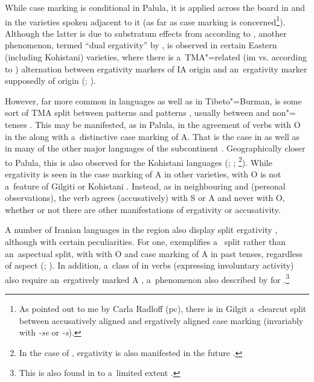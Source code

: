 While   case marking is conditional in Palula, it is applied across the board in \iliBurushaski and in the \iliShina varieties spoken adjacent to it (as far as case marking is concerned\footnote{As pointed out to me by Carla Radloff (pc), there is in Gilgit \iliShina a~clearcut split between accusatively aligned  and ergatively aligned case marking (invariably with \textit{-se} or \textit{-s}).}). Although the latter is due to substratum effects from \iliBurushaski according to \citet[248]{masica2001}, another phenomenon, termed ``dual ergativity'' by \citet[213]{hookkoul2004}, is observed in certain Eastern (including Kohistani) \iliShina varieties, where there is a~TMA"=related (im vs.  according to \citealt[51--53]{schmidtkohistani2008}) alternation between ergativity markers of IA origin and an~ergativity marker supposedly of \iliTibetan origin (\citealt[214]{hookkoul2004}; \citealt[211]{bailey1924}). 


\largerpage
However, far more common in \iliNIA languages as well as in Tibeto"=Burman, is some sort of TMA split between  patterns and  patterns \citep[248]{masica2001}, usually between  and non"= tenses \citep[342--343]{masica1991}. This may be manifested, as in Palula, in the agreement of  verbs with O in the  along with a~distinctive case marking of A. That is the case in \iliUrduHindi \citep[124]{schmidt1999} as well as in many of the other major \iliNIA languages of the subcontinent \citep[248]{masica2001}. Geographically closer to Palula, this is also observed for the Kohistani languages (\citealt[136]{baart1999a}; \citealt[34]{hallberghallberg1999}; \citealt[93--95]{lunsford2001}\footnote{In the case of \iliTorwali, ergativity is also manifested in the future .}). While ergativity is seen in the case marking of A in other \iliShina varieties,  with O is not a~feature of Gilgiti or Kohistani \iliShina. Instead, as in neighbouring \iliDameli and \iliGawarbati (personal observations), the verb agrees (accusatively) with S or A and never with O, whether or not there are other manifestations of ergativity or accusativity.



A number of Iranian languages in the region also display split ergativity \citep{payne1980}, although with certain peculiarities. For one, \iliPashto exemplifies a~ split rather than an~aspectual split, with  with O and  case marking of A in past tenses, regardless of aspect (\citealt[4--5]{tegey1977}; \citealt[71--72]{lorenz1979}). In addition, a~class of in verbs (expressing involuntary activity) also require an~ergatively marked A \citep[112]{babrakzai1999}, a~phenomenon also described by \citet[217]{hookkoul2004} for \iliIndoAryan \iliKashmiri.\footnote{This is also found in \iliUrdu to a~limited extent \citep[168]{schmidt1999}.} 



